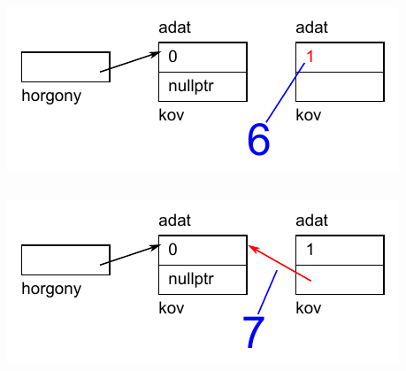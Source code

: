 \begin{frame}
  \begin{columns}[c]
      \begin{exampleblock}{}
        \vspace{-.2cm}
        \small
        
        \vspace{-.2cm}
      \end{exampleblock}
      \includegraphics[width=\textwidth]{verem/verem07.pdf}
  \end{columns}
\end{frame}

\begin{frame}
  \begin{columns}[c]
      \begin{exampleblock}{}
        \vspace{-.2cm}
        \small
        
        \vspace{-.2cm}
      \end{exampleblock}
      \includegraphics[width=\textwidth]{verem/verem08.pdf}
  \end{columns}
\end{frame}

